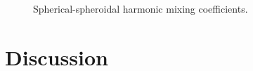\documentclass[twocolumn,aps,prd,floatfix,preprintnumbers,a4paper,nofootinbib,
superscriptaddress,10pt]{revtex4-1}
\begin{document}
\begin{figure}
\begin{tabular}{lcr}
  \end{tabular}
	\caption{ Spherical-spheroidal harmonic mixing coefficients. }
\end{figure}



%
\section{Discussion}
\label{discuss}



\end{document}
